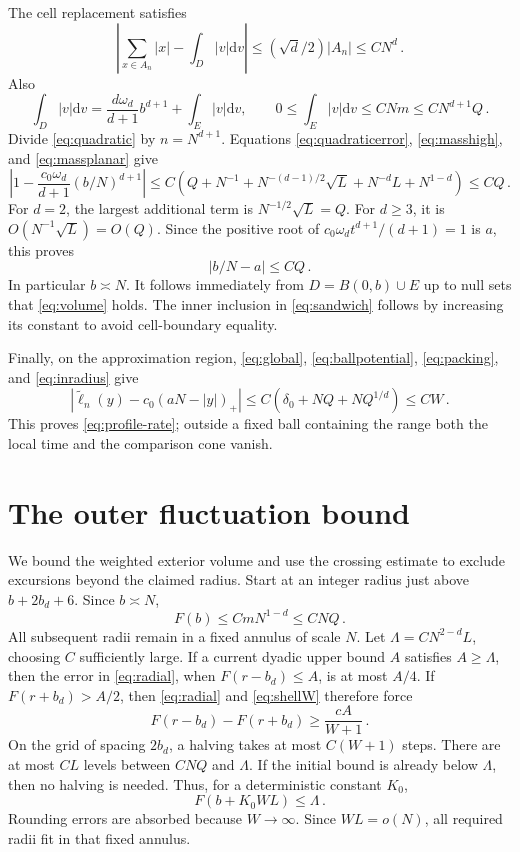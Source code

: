 \documentclass[11pt]{amsart}
\theoremstyle{plain}
\theoremstyle{definition}
\newcommand{\dd}{\mathrm d}
\begin{document}
The cell replacement satisfies
\[
 \left|\sum_{x\in A_n}|x|-\int_D|v|\dd v\right|
 \leq (\sqrt d/2)|A_n|\leq CN^d\, .
\]
Also
\[
 \int_D|v|\dd v
 =\frac{d\omega_d}{d+1}b^{d+1}+\int_E|v|\dd v,
 \qquad 0\leq\int_E|v|\dd v\leq CNm\leq CN^{d+1}Q\, .
\]
Divide \eqref{eq:quadratic} by $n=N^{d+1}$. Equations
\eqref{eq:quadraticerror}, \eqref{eq:masshigh}, and \eqref{eq:massplanar} give
\[
 \left|1-\frac{c_0\omega_d}{d+1}(b/N)^{d+1}\right|
 \leq C\left(Q+N^{-1}+N^{-(d-1)/2}\sqrt L
                         +N^{-d}L+N^{1-d}\right)
 \leq CQ\, .
\]
For $d=2$, the largest additional term is $N^{-1/2}\sqrt L=Q$.
For $d\geq3$, it is $O(N^{-1}\sqrt L)=O(Q)$.
Since the positive root of
$c_0\omega_d t^{d+1}/(d+1)=1$ is $a$, this proves
\begin{equation}\label{eq:inradius}
 |b/N-a|\leq CQ\, .
\end{equation}
In particular $b\asymp N$. It follows immediately from
$D=B(0,b)\cup E$ up to null sets that \eqref{eq:volume} holds.
The inner inclusion in \eqref{eq:sandwich} follows by increasing its
constant to avoid cell-boundary equality.

Finally, on the approximation region, \eqref{eq:global},
\eqref{eq:ballpotential}, \eqref{eq:packing}, and \eqref{eq:inradius} give
\[
 \left|\widetilde\ell_n(y)-c_0(aN-|y|)_+\right|
 \leq C(\delta_0+NQ+NQ^{1/d})\leq CW\, .
\]
This proves \eqref{eq:profile-rate}; outside a fixed ball containing the range
both the local time and the comparison cone vanish.

\section{The outer fluctuation bound}\label{sec:outer}
We bound the weighted exterior volume and use the crossing estimate
to exclude excursions beyond the claimed radius.
Start at an integer radius just above $b+2b_d+6$. Since $b\asymp N$,
\[
 F(b)\leq CmN^{1-d}\leq CNQ\, .
\]
All subsequent radii remain in a fixed annulus of scale $N$.
Let $\Lambda=CN^{2-d}L$, choosing $C$ sufficiently large.
If a current dyadic upper bound $A$ satisfies $A\geq\Lambda$, then the
error in \eqref{eq:radial}, when $F(r-b_d)\leq A$, is at most $A/4$.
If $F(r+b_d)>A/2$, then \eqref{eq:radial} and \eqref{eq:shellW} therefore force
\[
 F(r-b_d)-F(r+b_d)\geq \frac{cA}{W+1}\, .
\]
On the grid of spacing $2b_d$, a halving takes at most $C(W+1)$
steps. There are at most $CL$ levels between $CNQ$ and
$\Lambda$. If the initial bound is already below $\Lambda$, then no
halving is needed. Thus, for a deterministic constant $K_0$,
\begin{equation}\label{eq:tailend}
 F(b+K_0WL)\leq\Lambda\, .
\end{equation}
Rounding errors are absorbed because $W\to\infty$.
Since $WL=o(N)$, all required radii fit in that fixed annulus.
\end{document}
